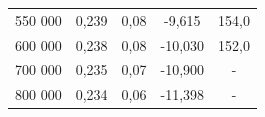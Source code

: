 \documentclass[a4paper, czech]{article}
\begin{document}
\begin{table}[H]
\begin{tabular}{rcccc}
        550 000     & 0,239                                                                       & 0,08                           & -9,615                                                       & 154,0                                                       \\
        600 000     & 0,238                                                                       & 0,08                           & -10,030                                                      & 152,0                                                       \\
        700 000     & 0,235                                                                       & 0,07                           & -10,900                                                      & -                                                           \\
        800 000     & 0,234                                                                       & 0,06                           & -11,398                                                      & -                                                           \\
        \bottomrule
    \end{tabular}
\end{table}
\end{document}
